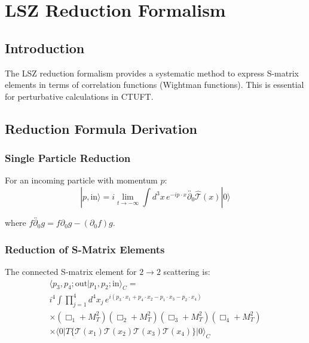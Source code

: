 \section{LSZ Reduction Formalism}
\label{sec:lsz}

\subsection{Introduction}

The LSZ reduction formalism provides a systematic method to express S-matrix elements in terms of correlation functions (Wightman functions). This is essential for perturbative calculations in CTUFT.

\subsection{Reduction Formula Derivation}

\subsubsection{Single Particle Reduction}

For an incoming particle with momentum $p$:
\begin{equation}
    |p, \text{in}\rangle = i \lim_{t \to -\infty} \int d^3x \, e^{-ip \cdot x} \overleftrightarrow{\partial_0} \hat{\mathcal{T}}(x) |0\rangle
\end{equation}

where $f \overleftrightarrow{\partial_0} g = f \partial_0 g - (\partial_0 f) g$.

\subsubsection{Reduction of S-Matrix Elements}

\begin{theorem}
The connected S-matrix element for $2 \to 2$ scattering is:
\begin{multline}
    \langle p_3, p_4; \text{out} | p_1, p_2; \text{in} \rangle_C = \\
    i^4 \int \prod_{j=1}^4 d^4x_j \, e^{i(p_3 \cdot x_1 + p_4 \cdot x_2 - p_1 \cdot x_3 - p_2 \cdot x_4)} \\
    \times (\Box_1 + M_T^2)(\Box_2 + M_T^2)(\Box_3 + M_T^2)(\Box_4 + M_T^2) \\
    \times \langle 0 | T\{\mathcal{T}(x_1)\mathcal{T}(x_2)\mathcal{T}(x_3)\mathcal{T}(x_4)\} | 0 \rangle_C
\end{multline}
\end{theorem}

